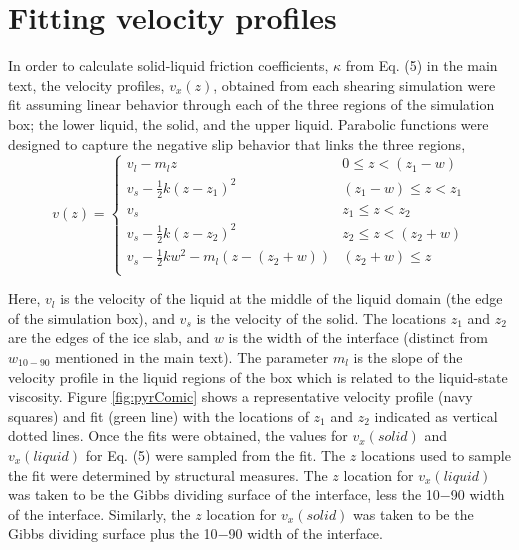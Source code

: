 \section{Fitting velocity profiles}
In order to calculate solid-liquid friction coefficients, $\kappa$
from Eq. (5) in the main text, the velocity profiles, $v_x(z)$,
obtained from each shearing simulation were fit assuming linear
behavior through each of the three regions of the simulation box; the
lower liquid, the solid, and the upper liquid. Parabolic functions
were designed to capture the negative slip behavior that links the
three regions,
\begin{equation}\label{vfit}
v(z) =
\begin{cases}
  v_{l} - m_{l}z & 0 \leq z < (z_{1} - w) \\
  v_{s} - \frac{1}{2}k(z-z_{1})^{2} & (z_{1}-w) \leq z < z_{1} \\
  v_{s}  & z_{1} \leq z < z_{2} \\
  v_{s} - \frac{1}{2}k(z-z_{2})^{2}  & z_{2} \leq z <( z_{2} + w)\\
  v_{s} - \frac{1}{2}kw^{2} - m_{l}(z-(z_{2} + w)) & (z_{2} + w) \leq z \\
\end{cases}
\end{equation}
  
Here, $v_{l}$ is the velocity of the liquid at the middle of the
liquid domain (the edge of the simulation box), and $v_{s}$ is the
velocity of the solid. The locations $z_{1}$ and $z_{2}$ are the edges
of the ice slab, and $w$ is the width of the interface (distinct from
$w_{10-90}$ mentioned in the main text). The parameter $m_{l}$ is the
slope of the velocity profile in the liquid regions of the box which
is related to the liquid-state viscosity. Figure \ref{fig:pyrComic}
shows a representative velocity profile (navy squares) and fit (green
line) with the locations of $z_{1}$ and $z_{2}$ indicated as vertical
dotted lines. Once the fits were obtained, the values for
$v_{x}(solid)$ and $v_{x}(liquid)$ for Eq. (5) were sampled from the
fit. The $z$ locations used to sample the fit were determined by
structural measures. The $z$ location for $v_{x}(liquid)$ was taken to
be the Gibbs dividing surface of the interface, less the 10$-$90 width
of the interface. Similarly, the $z$ location for $v_{x}(solid)$ was
taken to be the Gibbs dividing surface plus the 10$-$90 width of the
interface.

